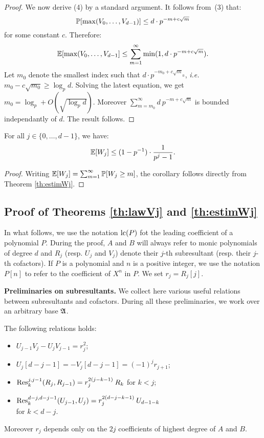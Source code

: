 \documentclass{sig-alternate}
\begin{document}
\begin{proof}
We now derive (4) by a standard argument. It follows from~(3) that:
$$\P[\max(V_0, \ldots, V_{d-1})] \leq d \cdot p^{-m + c\sqrt m}$$
for some constant $c$. Therefore:
$$\E[\max(V_0, \ldots, V_{d-1}] \leq \sum_{m=1}^\infty \min(1,
d \cdot p^{-m + c\sqrt m}).$$
Let $m_0$ denote the smallest index such that $d \cdot p^{-m_0 + c\sqrt 
m_0}$, \emph{i.e.} $m_0 - c \sqrt{m_0} \geq \log_p d$. Solving the latest
equation, we get $m_0 = \log_p + O(\sqrt{\log_p d})$. Moreover
$\sum_{m=m_0}^\infty d\: p^{-m + c\sqrt m}$ is bounded independantly of
$d$. The result follows.
\end{proof}

\begin{cor}
\label{cor:Wj}
For all $j \in \{0, \ldots, d-1\}$, we have:
$$\E[W_j] \leq (1 - p^{-1}) \cdot \frac 1 {p^j - 1}.$$
\end{cor}

\begin{proof}
Writing $\E[W_j] = \sum_{m=1}^\infty \P[W_j \geq m]$, the corollary
follows directly from Theorem \ref{th:estimWj}.
\end{proof}

\subsection{Proof of Theorems \ref{th:lawVj} and \ref{th:estimWj}}
\label{subsec:proof}

In what follows, we use the notation $\lc(P)$ fot the leading 
coefficient of a polynomial $P$. During the proof, $A$ and $B$ will 
always refer to monic polynomials of degree $d$ and $R_j$ (resp. $U_j$ 
and $V_j$) denote their $j$-th subresultant (resp. their $j$-th 
cofactors). If $P$ is a polynomial and $n$ is a positive integer, we 
use the notation $P[n]$ to refer to the coefficient of $X^n$ in $P$.
We set $r_j = R_j[j]$.

\medskip

\noindent
\textbf{Preliminaries on subresultants.}
We collect here various useful relations between subresultants and 
cofactors. During all these preliminaries, we work over an arbitrary
base $\ring$.

\begin{prop}
\label{prop:relations}
The following relations holds:
\begin{itemize}
\item $U_{j-1} V_j - U_j V_{j-1} = r_j^2$;
\item $U_j[d{-}j{-}1] = -V_j[d{-}j{-}1] = (-1)^j r_{j+1}$;
\item $\Res^{j,j-1}_k(R_j, R_{j-1}) = r_j^{2(j-k-1)} \: R_k$ for $k < j$;
\item $\Res^{d-j,d-j-1}_k(U_{j-1}, U_j) = r_j^{2(d-j-k-1)} \: U_{d-1-k}$\\
for $k < d-j$.
\end{itemize}
Moreover $r_j$ depends only on the $2j$ coefficients of highest 
degree of $A$ and $B$.
\end{prop}
\end{document}
